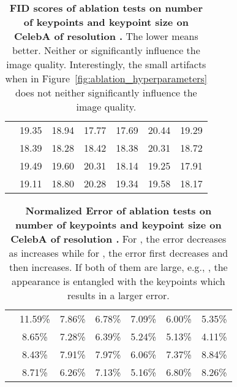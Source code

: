 \documentclass[10pt, conference, compsocconf]{IEEEtran}
\begin{document}
\begin{table*}[t]
\begin{center}
\begin{tabular}{|c|c|c|c|c|c|c|}
\hline
  &  &  &  &  &  & \\ 
\hline
 & 19.35 & 18.94 & 17.77 & 17.69 & 20.44 & 19.29\\ 
 & 18.39 & 18.28 & 18.42 & 18.38 & 20.31 & 18.72\\ 
 & 19.49 & 19.60 & 20.31 & 18.14 & 19.25 & 17.91\\ 
 & 19.11 & 18.80 & 20.28 & 19.34 & 19.58 & 18.17\\ 
\hline
\end{tabular}
\end{center}
\caption{\textbf{FID scores of ablation tests on number of keypoints  and keypoint size  on CelebA of resolution .} The lower means better. Neither  or  significantly influence the image quality. Interestingly, the small artifacts when  in Figure~\ref{fig:ablation_hyperparameters} does not neither significantly influence the image quality.}
\label{tab:ablation_n_keypoints_tau_fid}
\end{table*}

\begin{table*}[t]
\begin{center}
\begin{tabular}{|c|c|c|c|c|c|c|}
\hline
  &  &  &  &  &  & \\ 
\hline
 & 11.59\% & 7.86\% & 6.78\% & 7.09\% & 6.00\% & 5.35\%\\ 
 & 8.65\% & 7.28\% & 6.39\% & 5.24\% & 5.13\% & 4.11\%\\ 
 & 8.43\% & 7.91\% & 7.97\% & 6.06\% & 7.37\% & 8.84\%\\ 
 & 8.71\% & 6.26\% & 7.13\% & 5.16\% & 6.80\% & 8.26\%\\ 
\hline
\end{tabular}
\end{center}
\caption{\textbf{Normalized Error of ablation tests on number of keypoints  and keypoint size  on CelebA of resolution .} For , the error decreases as  increases while for , the error first decreases and then increases. If both of them are large, e.g., , the appearance is entangled with the keypoints which results in a larger error.}
\label{tab:ablation_n_keypoints_tau_acc}
\end{table*}
\end{document}

